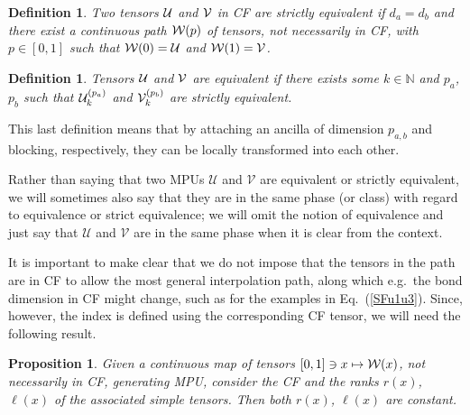 \documentclass[pra,twocolumn,nofootinbib,superscriptaddress]{revtex4-1}
\newtheorem{prop}[thm]{Proposition}
\newtheorem{defn}[thm]{Definition}
\begin{document}
\begin{defn}
	\label{def:strictly-equivalent-tensors}
	Two tensors ${\cal U}$ and ${\cal V}$ in CF are {\em strictly equivalent} if
	$d_a=d_b$ and there exist a continuous path ${\cal W}(p)$ of tensors, not
	necessarily in CF, with $p\in[0,1]$ such that ${\cal W}(0)={\cal U}$ and
	${\cal W}(1)={\cal V}$.
\end{defn}

\begin{defn}
	\label{def:equivalent-tensors}
	Tensors ${\cal U}$ and ${\cal V}$ are {\em equivalent} if there exists
	some $k\in \mathds{N}$ and $p_a$, $p_b$ such that ${\cal U}^{(p_a)}_{k}$
	and ${\cal V}^{(p_b)}_{k}$ are strictly equivalent.
\end{defn}
This last definition means that by attaching an ancilla of dimension
$p_{a,b}$ and blocking, respectively, they can be locally transformed into
each other.

Rather than saying that two MPUs $\mathcal U$ and $\mathcal V$ are
equivalent or strictly equivalent, we will sometimes also say that they
are in the same phase (or class) with regard to equivalence or strict
equivalence; we will omit the notion of equivalence and just say that
$\mathcal U$ and $\mathcal V$ are in the same phase when it is clear from
the context.

It is important to make clear that we do not impose that the tensors in
the path are in CF to allow the most general interpolation path, along
which e.g.\ the bond dimension in CF might change, such as for the
examples in Eq.~(\ref{SFu1u3}).  Since, however, the index is defined
using the corresponding CF tensor, we will need the following result.

\begin{prop}\label{prop:continuity-index}
	Given a continuous map of tensors $[0,1]\ni x\mapsto {\cal W}(x)$, not
	necessarily in CF, generating MPU, consider the CF and the ranks
	$r(x)$, $\ell(x)$ of the associated simple tensors. Then both $r(x)$,
	$\ell(x)$ are constant.
\end{prop}
\end{document}
